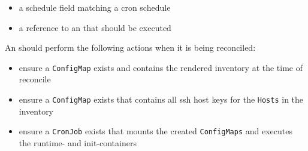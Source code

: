 \begin{itemize}
	\item{a schedule field matching a cron schedule}
	\item{a reference to an \anplaybook that should be executed}
\end{itemize}

An \anrecjob should perform the following actions when it is being reconciled:

\begin{itemize}
	\item{ensure a \texttt{ConfigMap} exists and contains the rendered inventory at the time of reconcile}
	\item{ensure a \texttt{ConfigMap} exists that contains all \gls{ssh} host keys for the \texttt{Hosts} in the inventory}
	\item{ensure a \texttt{CronJob} exists that mounts the created \texttt{ConfigMaps} and executes the runtime- and init-containers}
\end{itemize}
\clearpage
